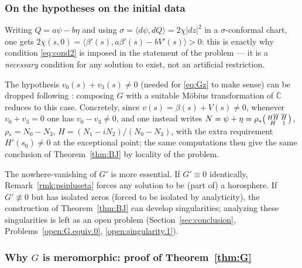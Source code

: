 \documentclass[11pt,a4paper]{article}
\newcommand{\Cbar}{\overline{\mathbb{C}}}           %
\newcommand{\ip}[2]{\langle #1,#2\rangle}            %
\theoremstyle{plain}
\theoremstyle{definition}
\theoremstyle{remark}
\begin{document}
\subsubsection{On the hypotheses on the initial data}

Writing $Q=a\psi-b\eta$ and using $\sigma=\ip{d\psi}{dQ}=2\chi|dz|^2$
in a $\sigma$-conformal chart, one gets $2\chi(s,0)=
\ip{\beta'(s)}{a\beta'(s)-bV'(s)}>0$: this is exactly why condition
\eqref{eq:cond2} is imposed in the statement of the problem — it is a
\emph{necessary} condition for any solution to exist, not an artificial
restriction.

The hypothesis $v_0(s)+v_3(s)\neq0$ (needed for \eqref{eq:Gz} to make
sense) can be dropped following \cite{GMM1}: composing $G$ with a
suitable Möbius transformation of $\Cbar$ reduces to this case. Concretely,
since $v(s)=\beta(s)+V(s)\neq0$, whenever $v_0+v_3=0$ one has
$v_0-v_3\neq0$, and one instead writes
$N=\psi+\eta=\rho_*\begin{psmallmatrix}H\overline H&\overline H\\H&1\end{psmallmatrix}$,
$\rho_*=N_0-N_3$, $H=(N_1-iN_2)/(N_0-N_3)$, with the extra requirement
$H'(s_0)\neq0$ at the exceptional point; the same computations then give
the same conclusion of Theorem~\ref{thm:BJ} by locality of the problem.

The nowhere-vanishing of $G'$ is more essential. If $G'\equiv0$
identically, Remark~\ref{rmk:psipluseta} forces any solution to be (part
of) a horosphere. If $G'\not\equiv0$ but has isolated zeros (forced to be
isolated by analyticity), the construction of Theorem~\ref{thm:BJ} can
develop singularities; analyzing these singularities is left as an open
problem (Section~\ref{sec:conclusion}, Problems~\ref{open:G.equiv.0},
\ref{open:singularity.1}).

\subsubsection{Why $G$ is meromorphic: proof of Theorem~\ref{thm:G}}
\end{document}
